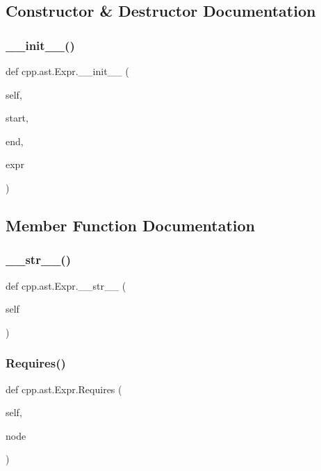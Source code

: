 \subsection{Constructor \& Destructor Documentation}
\mbox{\label{classcpp_1_1ast_1_1_expr_adc83f4b17d6e28a39781678692eb25aa}} 
\subsubsection{\texorpdfstring{\_\_init\_\_()}{\_\_init\_\_()}}
{\footnotesize\ttfamily def cpp.\+ast.\+Expr.\+\_\+\+\_\+init\+\_\+\+\_\+ (\begin{DoxyParamCaption}\item[{}]{self,  }\item[{}]{start,  }\item[{}]{end,  }\item[{}]{expr }\end{DoxyParamCaption})}



\subsection{Member Function Documentation}
\mbox{\label{classcpp_1_1ast_1_1_expr_a7ee1896fbfa7819adbd0b2f89d11ecec}} 
\subsubsection{\texorpdfstring{\_\_str\_\_()}{\_\_str\_\_()}}
{\footnotesize\ttfamily def cpp.\+ast.\+Expr.\+\_\+\+\_\+str\+\_\+\+\_\+ (\begin{DoxyParamCaption}\item[{}]{self }\end{DoxyParamCaption})}

\mbox{\label{classcpp_1_1ast_1_1_expr_a9c92416eb1285068f190dcda8fd33682}} 
\subsubsection{\texorpdfstring{Requires()}{Requires()}}
{\footnotesize\ttfamily def cpp.\+ast.\+Expr.\+Requires (\begin{DoxyParamCaption}\item[{}]{self,  }\item[{}]{node }\end{DoxyParamCaption})}


